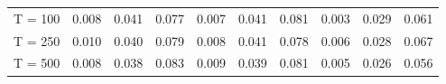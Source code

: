 % 
\begin{tabular}{cccccccccc}
  \hline
  \hline
T = 100 & 0.008 & 0.041 & 0.077 & 0.007 & 0.041 & 0.081 & 0.003 & 0.029 & 0.061 \\ 
  T = 250 & 0.010 & 0.040 & 0.079 & 0.008 & 0.041 & 0.078 & 0.006 & 0.028 & 0.067 \\ 
  T = 500 & 0.008 & 0.038 & 0.083 & 0.009 & 0.039 & 0.081 & 0.005 & 0.026 & 0.056 \\ 
   \hline
\end{tabular}
